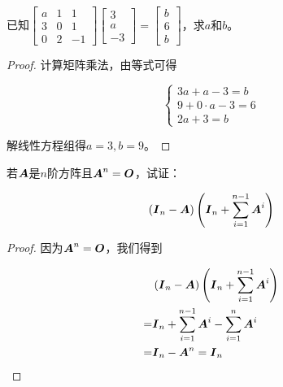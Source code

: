 \begin{problem}\label{problem-1.7}
已知\(\begin{bmatrix}a&1&1\\3&0&1\\0&2&-1\end{bmatrix}\begin{bmatrix}3\\a\\-3\end{bmatrix}=\begin{bmatrix}b\\6\\b\end{bmatrix}\)，求\(a\)和\(b\)。
\end{problem}
\begin{proof}
    计算矩阵乘法，由等式可得

    \begin{equation*}
        \begin{cases}
            3a+a-3=b       \\
            9+0\cdot a-3=6 \\
            2a+3=b
        \end{cases}
    \end{equation*}

    解线性方程组得\(a=3,b=9\)。
\end{proof}

\begin{problem}\label{problem-1.8}
若\(\boldsymbol{A}\)是\(n\)阶方阵且\(\boldsymbol{A}^n=\boldsymbol{O}\)，试证：

\begin{equation*}
    \left( \boldsymbol{I}_n-\boldsymbol{A} \right)\left( \boldsymbol{I}_n+\sum_{i=1}^{n-1}\boldsymbol{A}^i \right)
\end{equation*}
\end{problem}
\begin{proof}
    因为\(\boldsymbol{A}^n=\boldsymbol{O}\)，我们得到

    \begin{align*}
          & \left( \boldsymbol{I}_n-\boldsymbol{A} \right)\left( \boldsymbol{I}_n+\sum_{i=1}^{n-1}\boldsymbol{A}^i \right) \\
        = & \boldsymbol{I}_n+\sum_{i=1}^{n-1}\boldsymbol{A}^i-\sum_{i=1}^n\boldsymbol{A}^i        \\
        = & \boldsymbol{I}_n-\boldsymbol{A}^n=\boldsymbol{I}_n
    \end{align*}
\end{proof}

